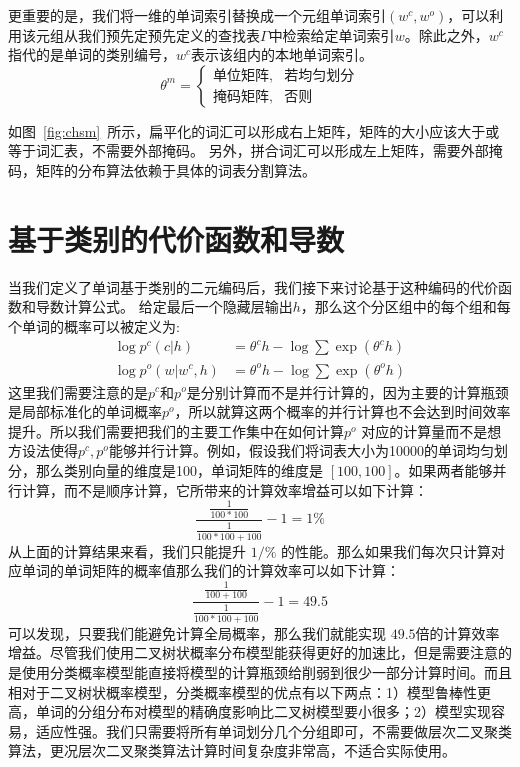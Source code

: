 更重要的是，我们将一维的单词索引替换成一个元组单词索引$(w ^ c,w ^ o)$，可以利用该元组从我们预先定预先定义的查找表$\Gamma $中检索给定单词索引$ w $。除此之外，$ w ^ c $指代的是单词的类别编号，$ w^c $表示该组内的本地单词索引。
\begin{equation}\label{equ:partition}
 \theta^m=
\begin{cases}
    \text{单位矩阵} ,& \text{若均匀划分} \\
    \text{掩码矩阵},   & \text{否则}
\end{cases}
\end{equation}


如图~\ref{fig:chsm}~所示，扁平化的词汇可以形成右上矩阵，矩阵的大小应该大于或等于词汇表，不需要外部掩码。
另外，拼合词汇可以形成左上矩阵，需要外部掩码，矩阵的分布算法依赖于具体的词表分割算法。

\section{基于类别的代价函数和导数}
当我们定义了单词基于类别的二元编码后，我们接下来讨论基于这种编码的代价函数和导数计算公式。
给定最后一个隐藏层输出$ h $，那么这个分区组中的每个组和每个单词的概率可以被定义为:
\begin{equation}
\begin{split}
\log p^c(c|h) &= \theta^c h-\log \sum{\exp( \theta^c h )} \\
\log p^o(w|w^c,h)&=\theta^o h -\log\sum\exp{(\theta^o h)}
\end{split}
\end{equation}
这里我们需要注意的是$ p ^ c $和$ p ^o $是分别计算而不是并行计算的，因为主要的计算瓶颈是局部标准化的单词概率$ p ^ o $，所以就算这两个概率的并行计算也不会达到时间效率提升。所以我们需要把我们的主要工作集中在如何计算$p^o$ 对应的计算量而不是想方设法使得$p^c,p^o$能够并行计算。例如，假设我们将词表大小为10000的单词均匀划分，那么类别向量的维度是100，单词矩阵的维度是 $[100,100]$。如果两者能够并行计算，而不是顺序计算，它所带来的计算效率增益可以如下计算：
\begin{equation}\label{equ:example}
  \frac{\frac{1}{100*100}}{\frac{1}{100*100+100}}-1=1\%
\end{equation}
从上面的计算结果来看，我们只能提升 $1/\%$ 的性能。那么如果我们每次只计算对应单词的单词矩阵的概率值那么我们的计算效率可以如下计算：
\begin{equation}\label{equ:example2}
  \frac{\frac{1}{100+100}}{\frac{1}{100*100+100}}-1=49.5
\end{equation}
可以发现，只要我们能避免计算全局概率，那么我们就能实现 $49.5$倍的计算效率增益。尽管我们使用二叉树状概率分布模型能获得更好的加速比，但是需要注意的是使用分类概率模型能直接将模型的计算瓶颈给削弱到很少一部分计算时间。而且相对于二叉树状概率模型，分类概率模型的优点有以下两点：1）模型鲁棒性更高，单词的分组分布对模型的精确度影响比二叉树模型要小很多；2）模型实现容易，适应性强。我们只需要将所有单词划分几个分组即可，不需要做层次二叉聚类算法，更况层次二叉聚类算法计算时间复杂度非常高，不适合实际使用。



